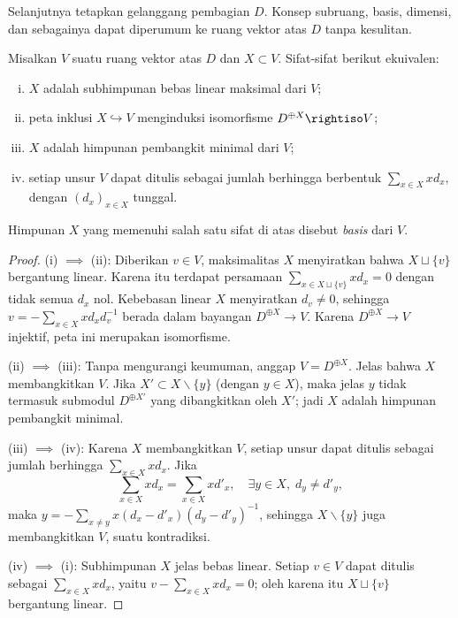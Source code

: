 Selanjutnya tetapkan gelanggang pembagian $D$. Konsep subruang, basis, dimensi, dan sebagainya dapat diperumum ke ruang vektor atas $D$ tanpa kesulitan.

\begin{definition-theorem}
	Misalkan $V$ suatu ruang vektor atas $D$ dan $X \subset V$. Sifat-sifat berikut ekuivalen:
	\begin{enumerate}[(i)]
		\item $X$ adalah subhimpunan bebas linear maksimal dari $V$;
		\item peta inklusi $X \hookrightarrow V$ menginduksi isomorfisme $D^{\oplus X} \rightiso V$;
		\item $X$ adalah himpunan pembangkit minimal dari $V$;
		\item setiap unsur $V$ dapat ditulis sebagai jumlah berhingga berbentuk $\sum_{x \in X} x d_x$, dengan $(d_x)_{x \in X}$ tunggal.
	\end{enumerate}
	Himpunan $X$ yang memenuhi salah satu sifat di atas disebut \emph{basis} dari $V$.
\end{definition-theorem}
\begin{proof}
	(i) $\implies$ (ii): Diberikan $v \in V$, maksimalitas $X$ menyiratkan bahwa $X \sqcup \{v\}$ bergantung linear. Karena itu terdapat persamaan $\sum_{x \in X \sqcup \{v\}} x d_x = 0$ dengan tidak semua $d_x$ nol. Kebebasan linear $X$ menyiratkan $d_v \neq 0$, sehingga $v = -\sum_{x \in X} x d_x d_v^{-1}$ berada dalam bayangan $D^{\oplus X} \to V$. Karena $D^{\oplus X} \to V$ injektif, peta ini merupakan isomorfisme.

	(ii) $\implies$ (iii): Tanpa mengurangi keumuman, anggap $V = D^{\oplus X}$. Jelas bahwa $X$ membangkitkan $V$. Jika $X' \subset X \smallsetminus \{y\}$ (dengan $y \in X$), maka jelas $y$ tidak termasuk submodul $D^{\oplus X'}$ yang dibangkitkan oleh $X'$; jadi $X$ adalah himpunan pembangkit minimal.

	(iii) $\implies$ (iv): Karena $X$ membangkitkan $V$, setiap unsur dapat ditulis sebagai jumlah berhingga $\sum_{x \in X} x d_x$. Jika
	\[ \sum_{x \in X} x d_x = \sum_{x \in X} x d'_x, \quad \exists y \in X, \; d_y \neq d'_y, \]
	maka $y = -\sum_{x \neq y} x (d_x - d'_x)(d_y - d'_y)^{-1}$, sehingga $X \smallsetminus \{y\}$ juga membangkitkan $V$, suatu kontradiksi.

	(iv) $\implies$ (i): Subhimpunan $X$ jelas bebas linear. Setiap $v \in V$ dapat ditulis sebagai $\sum_{x \in X} x d_x$, yaitu $v - \sum_{x \in X} x d_x = 0$; oleh karena itu $X \sqcup \{v\}$ bergantung linear.
\end{proof}

